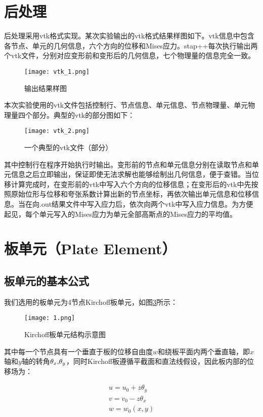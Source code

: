\documentclass[forprint]{WHUBachelor}
\begin{document}
\section{后处理}
后处理采用vtk格式实现。某次实验输出的vtk格式结果样图如下。vtk信息中包含各节点、单元的几何信息，六个方向的位移和Mises应力。stap++每次执行输出两个vtk文件，分别对应变形前和变形后的几何信息，七个物理量的信息完全一致。
\begin{figure}[H]
\centering  
\texttt{[image: vtk\_1.png]} 
\caption{输出结果样图} 
\label{f3.1} 
\end{figure}
本次实验使用的vtk文件包括控制行、节点信息、单元信息、节点物理量、单元物理量四个部分。典型的vtk的部分图如下：
\begin{figure}[H]
\centering  
\texttt{[image: vtk\_2.png]} 
\caption{一个典型的vtk文件（部分）} 
\label{f3.2} 
\end{figure}
其中控制行在程序开始执行时输出。变形前的节点和单元信息分别在读取节点和单元信息之后立即输出，保证即使无法求解也能够绘制出几何信息，便于查错。当位移计算完成时，在变形前的vtk中写入六个方向的位移信息；在变形后的vtk中先按照原始位形与位移和夸张系数计算出新的节点坐标，再依次输出单元信息和位移信息。当在向.out结果文件中写入应力后，依次向两个vtk中写入应力信息。为方便起见，每个单元写入的Mises应力为单元全部高斯点的Mises应力的平均值。

\section{板单元（Plate Element）}

\subsection{板单元的基本公式}

我们选用的板单元为4节点Kirchoff板单元，如图\ref{f1}所示：

\begin{figure}[H]
\centering  
\texttt{[image: 1.png]} 
\caption{Kirchoff板单元结构示意图} 
\label{f1} 
\end{figure}

其中每一个节点具有一个垂直于板的位移自由度$w$和绕板平面内两个垂直轴，即$x$轴和$y$轴的转角$\text{\ensuremath{\theta_{x}},\ensuremath{\theta_{y}}}$，同时Kirchoff板遵循平截面和直法线假设，因此板内部的位移场为：

\begin{equation}
\begin{array}{l}
{u=u_{0}+z\theta_{y}}\\
{v=v_{0}-z\theta_{x}}\\
{w=w_{0}(x,y)}
\end{array}\label{eq1}
\end{equation}
\end{document}
